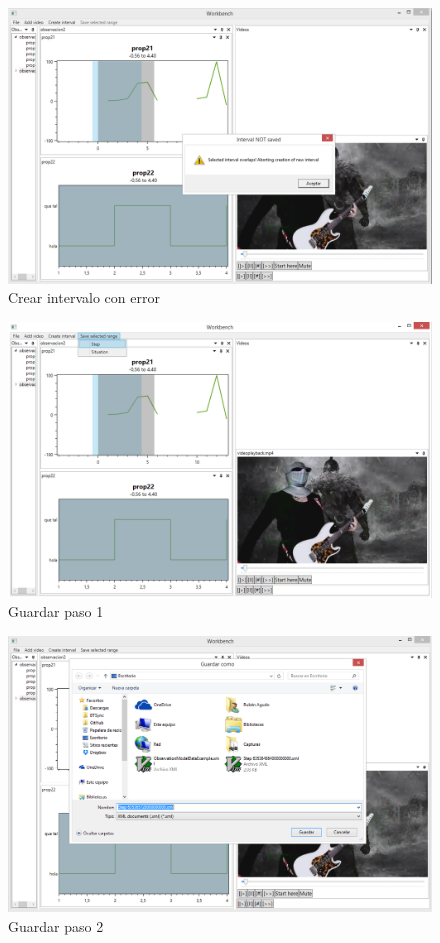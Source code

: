 \begin{figure}[h]
\centering
\includegraphics[width=0.9\linewidth]{./Figures/Capturas/IntervaloCreadoError.PNG}
\caption{Crear intervalo con  error}
\label{fig:CrearIntervaloError}
\end{figure}

\begin{figure}[h]
\centering
\includegraphics[width=0.9\linewidth]{./Figures/Capturas/GuardarPaso1.png}
\caption{Guardar paso 1}
\label{fig:GuardarPaso1}
\end{figure}

\begin{figure}[h]
\centering
\includegraphics[width=0.9\linewidth]{./Figures/Capturas/GuardarPaso2.PNG}
\caption{Guardar paso 2}
\label{fig:GuardarPaso2}
\end{figure}

